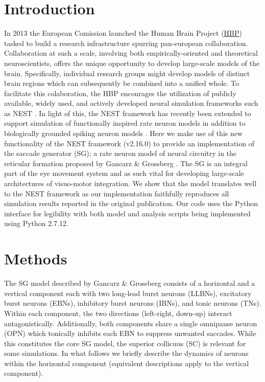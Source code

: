 \documentclass[10pt,a4paper,onecolumn]{article}
\begin{document}
\section{Introduction}\label{introduction}

In 2013 the European Comission launched the Human Brain Project
(\href{https://www.humanbrainproject.eu/en/}{HBP}) tasked to build a
research infrastructure spurring pan-european collaboration.
Collaboration at such a scale, involving both empirically-oriented and
theoretical neuroscientists, offers the unique opportunity to develop
large-scale models of the brain. Specifically, individual research
groups might develop models of distinct brain regions which can
subsequently be combined into a unified whole. To facilitate this
colaboration, the HBP encourages the utilization of publicly available,
widely used, and actively developed neural simulation frameworks such as
NEST \autocite{Gewaltig2007}. In light of this, the NEST framework has
recently been extended to support simulation of functionally inspired
rate neuron models in addition to biologically grounded spiking neuron
models \autocite{Hahne2017}. Here we make use of this new functionality
of the NEST framework (v2.16.0) to provide an implementation of the
saccade generator (SG); a rate neuron model of neural circuitry in the
reticular formation proposed by Gancarz \& Grossberg
\autocite{Gancarz1998}. The SG is an integral part of the eye movement
system \autocite{Grossberg2012} and as such vital for developing
large-scale architectures of visuo-motor integration. We show that the
model translates well to the NEST framework as our implementation
faithfully reproduces all simulation results reported in the original
publication. Our code uses the Python interface \autocite{Eppler2008}
for legibility with both model and analysis scripts being implemented
using Python 2.7.12.

\section{Methods}\label{methods}

The SG model described by Gancarz \& Grossberg \autocite{Gancarz1998}
consists of a horizontal and a vertical component each with two
long-lead burst neurons (LLBNs), excitatory burst neurons (EBNs),
inhibitory burst neurons (IBNs), and tonic neurons (TNs). Within each
component, the two directions (left-right, down-up) interact
antagonistically. Additionally, both components share a single omnipause
neuron (OPN) which tonically inhibits each EBN to suppress unwanted
saccades. While this constitutes the core SG model, the superior
collicuus (SC) is relevant for some simulations. In what follows we
briefly describe the dynamics of neurons within the horizontal component
(equivalent descriptions apply to the vertical component).
\end{document}
